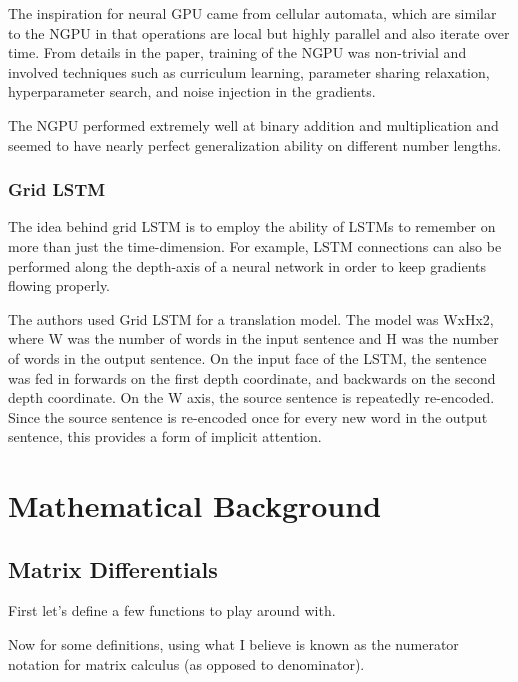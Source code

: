 \documentclass[12pt]{article}
\begin{document}
The inspiration for neural GPU came from cellular automata, which are similar to the NGPU in that operations are local but highly parallel and also iterate over time. From details in the paper, training of the NGPU was non-trivial and involved techniques such as curriculum learning, parameter sharing relaxation, hyperparameter search, and noise injection in the gradients.

The NGPU performed extremely well at binary addition and multiplication and seemed to have nearly perfect generalization ability on different number lengths.

\subsubsection{Grid LSTM}

The idea behind grid LSTM is to employ the ability of LSTMs to remember on more than just the time-dimension. For example, LSTM connections can also be performed along the depth-axis of a neural network in order to keep gradients flowing properly. 

The authors used Grid LSTM for a translation model. The model was WxHx2, where W was the number of words in the input sentence and H was the number of words in the output sentence. On the input face of the LSTM, the sentence was fed in forwards on the first depth coordinate, and backwards on the second depth coordinate. On the W axis, the source sentence is repeatedly re-encoded. Since the source sentence is re-encoded once for every new word in the output sentence, this provides a form of implicit attention.

\section{Mathematical Background}

\subsection{Matrix Differentials}

First let's define a few functions to play around with.


Now for some definitions, using what I believe is known as the numerator notation for matrix calculus (as opposed to denominator).
\end{document}
